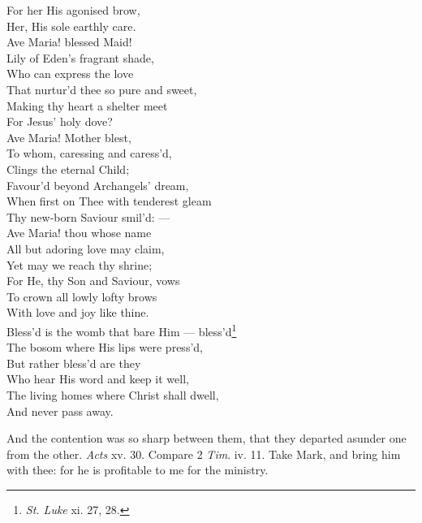  For her His agonised brow, \\
 Her, His sole earthly care. \\
  Ave Maria! blessed Maid! \\
 Lily of Eden’s fragrant shade, \\
 Who can express the love \\
 That nurtur’d thee so pure and sweet, \\
 Making thy heart a shelter meet \\
 For Jesus’ holy dove? \\
  Ave Maria! Mother blest, \\
 To whom, caressing and caress’d, \\
 Clings the eternal Child; \\
 Favour’d beyond Archangels’ dream, \\
 When first on Thee with tenderest gleam \\
 Thy new-born Saviour smil’d: — \\
  Ave Maria! thou whose name \\
 All but adoring love may claim, \\
 Yet may we reach thy shrine; \\
 For He, thy Son and Saviour, vows \\
 To crown all lowly lofty brows \\
 With love and joy like thine. \\
  Bless’d is the womb that bare Him — bless’d\footnote{\emph{St. Luke} xi. 27, 28.} \\
 The bosom where His lips were press’d, \\
 But rather bless’d are they \\
 Who hear His word and keep it well, \\
 The living homes where Christ shall dwell, \\
 And never pass away.\\


And the contention was so sharp between them, that they departed asunder one from the other. \emph{Acts} xv. 30. Compare 2 \emph{Tim}. iv. 11. Take Mark, and bring him with thee: for he is profitable to me for the ministry.

